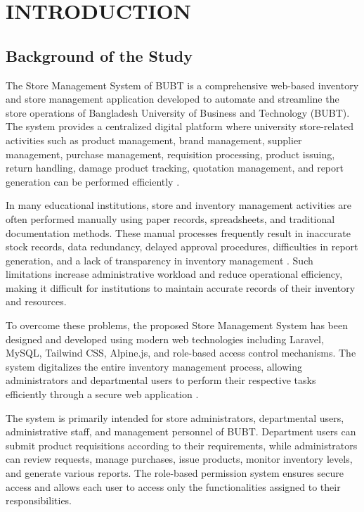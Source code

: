 \chapter{INTRODUCTION}
\label{chap:introduction}

\section{Background of the Study}

The Store Management System of BUBT is a comprehensive web-based inventory and store management application developed to automate and streamline the store operations of Bangladesh University of Business and Technology (BUBT). The system provides a centralized digital platform where university store-related activities such as product management, brand management, supplier management, purchase management, requisition processing, product issuing, return handling, damage product tracking, quotation management, and report generation can be performed efficiently \cite{bubt_inventory}.

In many educational institutions, store and inventory management activities are often performed manually using paper records, spreadsheets, and traditional documentation methods. These manual processes frequently result in inaccurate stock records, data redundancy, delayed approval procedures, difficulties in report generation, and a lack of transparency in inventory management \cite{web_inventory_systems}. Such limitations increase administrative workload and reduce operational efficiency, making it difficult for institutions to maintain accurate records of their inventory and resources.

To overcome these problems, the proposed Store Management System has been designed and developed using modern web technologies including Laravel, MySQL, Tailwind CSS, Alpine.js, and role-based access control mechanisms. The system digitalizes the entire inventory management process, allowing administrators and departmental users to perform their respective tasks efficiently through a secure web application \cite{laravel_inventory}.

The system is primarily intended for store administrators, departmental users, administrative staff, and management personnel of BUBT. Department users can submit product requisitions according to their requirements, while administrators can review requests, manage purchases, issue products, monitor inventory levels, and generate various reports. The role-based permission system ensures secure access and allows each user to access only the functionalities assigned to their responsibilities.

